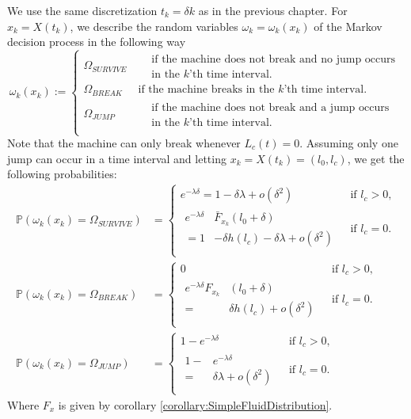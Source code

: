 We use the same discretization $t_k=\delta k$ as in the previous chapter.
For $x_k=X(t_k)$, we describe the random variables $\omega_k=\omega_k(x_k)$ of the Markov decision process in the following way
\[
\omega_k(x_k):=\begin{cases}
\Omega_{SURVIVE}&\ \begin{split}&\text{if the machine does not break and no jump occurs}\\
&\text{in the $k$'th time interval.}\end{split}\\
\Omega_{BREAK}&\ \text{if the machine breaks in the $k$'th time interval.}\\
\Omega_{JUMP}&\ \begin{split}&\text{if the machine does not break and a jump occurs}\\
&\text{in the $k$'th time interval.}\end{split}\\
\end{cases}
\]
Note that the machine can only break whenever $L_c(t)=0$.
Assuming only one jump can occur in a time interval and letting $x_k=X(t_k)=(l_0,l_c)$, we get the following probabilities:
\[
\begin{split}
\mathbb{P}(\omega_k(x_k)=\Omega_{SURVIVE})&=\begin{cases}
e^{-\lambda \delta}=1-\delta\lambda+o(\delta^2)&\text{ if }l_c>0,\\
\begin{split}
e^{-\lambda \delta} & \bar{F}_{x_k}(l_0+\delta)\\
=1&-\delta h(l_c)-\delta\lambda+o(\delta^2)
\end{split}&\text{ if }l_c=0.\\
\end{cases}\\
\mathbb{P}(\omega_k(x_k)=\Omega_{BREAK})&=\begin{cases}
0&\text{ if }l_c>0,\\
\begin{split}
e^{-\lambda \delta}F_{x_k}&(l_0+\delta)\\
=&\delta h(l_c)+o(\delta^2)
\end{split}&\text{ if }l_c=0.\\
\end{cases}\\
\mathbb{P}(\omega_k(x_k)=\Omega_{JUMP})&=\begin{cases}
1-e^{-\lambda \delta} & \text{ if }l_c>0,\\
\begin{split}
1-&e^{-\lambda \delta}\\
=&\delta\lambda+o(\delta^2)
\end{split}&\text{ if }l_c=0.\\
\end{cases}
\end{split}
\]
Where $F_x$ is given by corollary \ref{corollary:SimpleFluidDistribution}.

